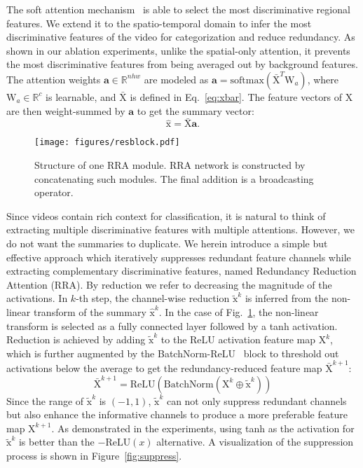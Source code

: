 \documentclass[runningheads]{llncs}
\def\x{\boldsymbol{\mathrm{x}}}
\def\X{\boldsymbol{\mathrm{X}}}
\def\a{\mathbf{a}}
\def\W{\boldsymbol{\mathrm{W}}}
\def\Re{\mathbb{R}}
\begin{document}
The soft attention mechanism~\cite{fukui2016multimodal,xu2015show} is able to select the most discriminative regional features. We extend it to the spatio-temporal domain to infer the most discriminative features of the video for categorization and reduce redundancy. 
As shown in our ablation experiments, unlike the spatial-only attention, it prevents the most discriminative features from being averaged out by background features. The attention weights $\a\in \Re^{nhw}$ are modeled as $\a = \mathrm{softmax}(\bar{\X}^T\W_a)$, 
where $\W_a\in \Re^{c}$ is learnable, and $\bar{\X}$ is defined in Eq.~\ref{eq:xbar}. The feature vectors of $\X$ are then weight-summed by $\a$ to get the summary vector:
\begin{equation}\label{eq:att}
	\hat{\x} = \bar{\X}\a.
\end{equation}

\begin{figure}[htbp]
\centering
\texttt{[image: figures/resblock.pdf]}
\caption{Structure of one RRA module. RRA network is constructed by concatenating such modules. The final addition is a broadcasting operator.}
\label{fig:resblock}
\end{figure}

Since videos contain rich context for classification, it is natural to think of extracting multiple discriminative features with multiple attentions. 
However, we do not want the summaries to duplicate. 
We herein introduce a simple but effective approach which iteratively suppresses redundant feature channels while extracting complementary discriminative features, named Redundancy Reduction Attention (RRA). 
By reduction we refer to decreasing the magnitude of the activations. 
In $k$-th step, the channel-wise reduction $\tilde{\x}^k$ is inferred from the non-linear transform of the summary $\hat{\x}^k$. 
In the case of Fig.~\ref{fig:resblock}, the non-linear transform is selected as a fully connected layer followed by a tanh activation. Reduction is achieved by adding $\tilde{\x}^k$ to the ReLU activation feature map $\X^k$, which is further augmented by the BatchNorm-ReLU~\cite{ioffe2015batch} block to threshold out activations below the average to get the redundancy-reduced feature map $\bar{\X}^{k+1}$: 
\begin{equation}\label{eq:xbar}
\bar{\X}^{k+1}=\mathrm{ReLU}(\mathrm{BatchNorm}(\X^{k}\oplus\tilde{\x}^k))
\end{equation}
Since the range of $\tilde{\x}^k$ is $(-1,1)$, $\tilde{\x}^k$ can not only suppress redundant channels but also enhance the informative channels to produce a more preferable feature map $\X^{k+1}$. As demonstrated in the experiments, using tanh as the activation for~$\tilde{\x}^{k}$ is better than the $-\mathrm{ReLU}(x)$ alternative. 
A visualization of the suppression process is shown in Figure~\ref{fig:suppress}. 
\end{document}
